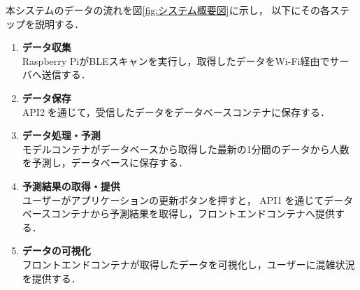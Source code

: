 本システムのデータの流れを図\ref{fig:システム概要図}に示し，
以下にその各ステップを説明する．
\begin{enumerate}
	\item {\bfseries データ収集}\\
	Raspberry PiがBLEスキャンを実行し，取得したデータをWi-Fi経由でサーバへ送信する．
	
	\item {\bfseries データ保存} \\
	API\textcircled{2}を通じて，受信したデータをデータベースコンテナに保存する．
	
	\item {\bfseries データ処理・予測} \\
	モデルコンテナがデータベースから取得した最新の1分間のデータから人数を予測し，データベースに保存する．
	
	\item {\bfseries 予測結果の取得・提供} \\
	ユーザーがアプリケーションの更新ボタンを押すと，
	API\textcircled{1}を通じてデータベースコンテナから予測結果を取得し，フロントエンドコンテナへ提供する．
	
	\item {\bfseries データの可視化} \\
	フロントエンドコンテナが取得したデータを可視化し，ユーザーに混雑状況を提供する．
\end{enumerate}
